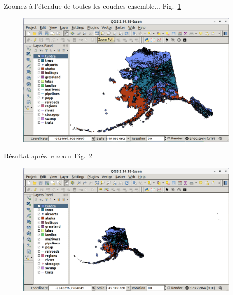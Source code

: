 Zoomez \`a l'\'etendue de toutes les couches ensemble... Fig.~\ref{fig:qgis004}

\begin{figure}[htbp]
   \centering
   \includegraphics[scale=0.19]{qgis004.png}
   \caption{}
   \label{fig:qgis004}
\end{figure}

R\'esultat apr\`es le zoom Fig.~\ref{fig:qgis005}

\begin{figure}[htbp]
   \centering
   \includegraphics[scale=0.2]{qgis005.png}
   \caption{}
   \label{fig:qgis005}
\end{figure}

